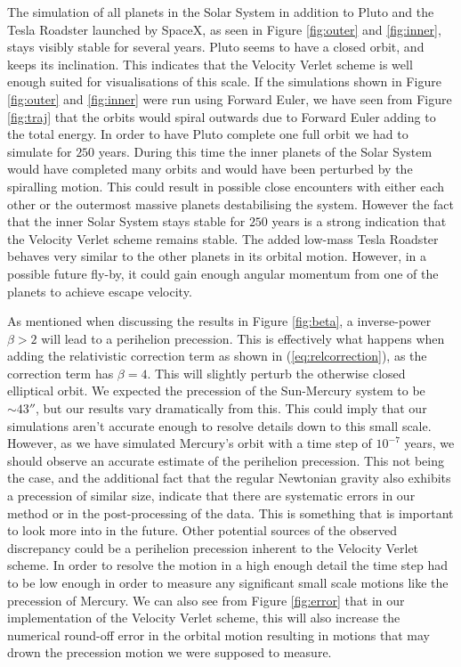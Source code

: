\documentclass[twocolumn]{aastex62}
\begin{document}
The simulation of all planets in the Solar System in addition to Pluto and 
the Tesla Roadster launched by SpaceX, as seen in Figure \ref{fig:outer} and \ref{fig:inner}, stays visibly stable for several years. Pluto seems to 
have a closed orbit, and keeps its inclination. This indicates that 
the Velocity Verlet scheme is well enough suited for visualisations of this scale. 
If the simulations shown in Figure \ref{fig:outer} and \ref{fig:inner} 
were run using Forward Euler, we have seen from Figure \ref{fig:traj} that the orbits would spiral outwards due to Forward Euler adding to the total energy. In order to have Pluto complete one full orbit we had to simulate for $250$ years. During this time the inner planets of the Solar System would have completed many orbits and would have been perturbed by the spiralling motion. This could result in possible close encounters with either each other or the outermost massive planets destabilising the system. However the fact that the inner Solar System stays stable for $250$ years is a strong indication that the Velocity Verlet scheme remains stable. The added low-mass Tesla Roadster behaves very similar to the other planets in its orbital motion. However, in a possible future fly-by, it could gain enough angular momentum from one of the planets to achieve escape velocity.

As mentioned when discussing the results in Figure \ref{fig:beta}, a 
inverse-power $\beta>2$ will lead to a perihelion precession. This is effectively 
what happens when adding the relativistic correction term as shown in 
(\ref{eq:relcorrection}), as the correction term has $\beta=4$. This 
will slightly perturb the otherwise closed elliptical orbit.
We expected the precession of the Sun-Mercury system to be $\sim 43''$, 
but our results vary dramatically from this. This could imply that our 
simulations aren't accurate enough to resolve details down to this small 
scale. However, as we have simulated Mercury's orbit with a time step of 
$10^{-7}$ years, we should observe an accurate estimate of the perihelion 
precession. This not being the case, and the additional fact that the regular Newtonian gravity also exhibits a precession of similar size, indicate that there are systematic 
errors in our method or in the post-processing of the data. This is something that is important to look 
more into in the future. Other potential sources of the observed 
discrepancy could be a perihelion precession inherent to the Velocity 
Verlet scheme. In order to resolve the motion in a high enough detail the 
time step had to be low enough in order to measure any significant small 
scale motions like the precession of Mercury. We can also see from Figure 
\ref{fig:error} that in our implementation of the Velocity Verlet scheme, 
this will also increase the numerical round-off error in the orbital motion resulting in 
motions that may drown the precession motion we were supposed to measure.
\end{document}
